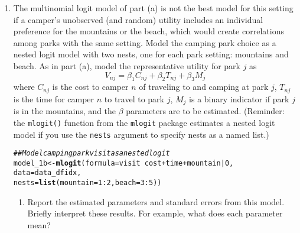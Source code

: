 \documentclass[11pt,letterpaper]{article}\usepackage[]{graphicx}\usepackage[]{xcolor}
\makeatletter
\newcommand{\hlnum}[1]{\textcolor[rgb]{0.686,0.059,0.569}{#1}}%
\newcommand{\hlcom}[1]{\textcolor[rgb]{0.678,0.584,0.686}{\textit{#1}}}%
\newcommand{\hlopt}[1]{\textcolor[rgb]{0,0,0}{#1}}%
\newcommand{\hlstd}[1]{\textcolor[rgb]{0.345,0.345,0.345}{#1}}%
\newcommand{\hlkwb}[1]{\textcolor[rgb]{0.69,0.353,0.396}{#1}}%
\newcommand{\hlkwc}[1]{\textcolor[rgb]{0.333,0.667,0.333}{#1}}%
\newcommand{\hlkwd}[1]{\textcolor[rgb]{0.737,0.353,0.396}{\textbf{#1}}}%
\newenvironment{kframe}{%
 \def\at@end@of@kframe{}%
 \ifinner\ifhmode%
  \def\at@end@of@kframe{\end{minipage}}%
  \begin{minipage}{\columnwidth}%
 \fi\fi%
 \def\FrameCommand##1{\hskip\@totalleftmargin \hskip-\fboxsep
 \colorbox{shadecolor}{##1}\hskip-\fboxsep
     \hskip-\linewidth \hskip-\@totalleftmargin \hskip\columnwidth}%
 \MakeFramed {\advance\hsize-\width
   \@totalleftmargin\z@ \linewidth\hsize
   \@setminipage}}%
 {\par\unskip\endMakeFramed%
 \at@end@of@kframe}
\newenvironment{knitrout}{}{} %
\makeatother
\begin{document}
\begin{enumerate}[label=\alph*., leftmargin=*]
	\item The multinomial logit model of part (a) is not the best model for this setting if a camper's unobserved (and random) utility includes an individual preference for the mountains or the beach, which would create correlations among parks with the same setting. Model the camping park choice as a nested logit model with two nests, one for each park setting: mountains and beach. As in part (a), model the representative utility for park $j$ as
	$$V_{nj} = \beta_1 C_{nj} + \beta_2 T_{nj} + \beta_3 M_j$$
	where $C_{nj}$ is the cost to camper $n$ of traveling to and camping at park $j$, $T_{nj}$ is the time for camper $n$ to travel to park $j$, $M_j$ is a binary indicator if park $j$ is in the mountains, and the $\beta$ parameters are to be estimated. (Reminder: the \texttt{mlogit()} function from the \texttt{mlogit} package estimates a nested logit model if you use the \texttt{nests} argument to specify nests as a named list.)

\begin{knitrout}
\color{fgcolor}\begin{kframe}
\begin{alltt}
\hlcom{## Model camping park visit as a nested logit}
\hlstd{model_1b} \hlkwb{<-} \hlkwd{mlogit}\hlstd{(}\hlkwc{formula} \hlstd{= visit} \hlopt{~} \hlstd{cost} \hlopt{+} \hlstd{time} \hlopt{+} \hlstd{mountain} \hlopt{|} \hlnum{0}\hlstd{,}
                   \hlkwc{data} \hlstd{= data_dfidx,}
                   \hlkwc{nests} \hlstd{=} \hlkwd{list}\hlstd{(}\hlkwc{mountain} \hlstd{=} \hlnum{1}\hlopt{:}\hlnum{2}\hlstd{,} \hlkwc{beach} \hlstd{=} \hlnum{3}\hlopt{:}\hlnum{5}\hlstd{))}
\end{alltt}
\end{kframe}
\end{knitrout}

	\begin{enumerate}[label=\roman*.]
		\item Report the estimated parameters and standard errors from this model. Briefly interpret these results. For example, what does each parameter mean?


\end{enumerate}
\end{enumerate}
\end{document}
